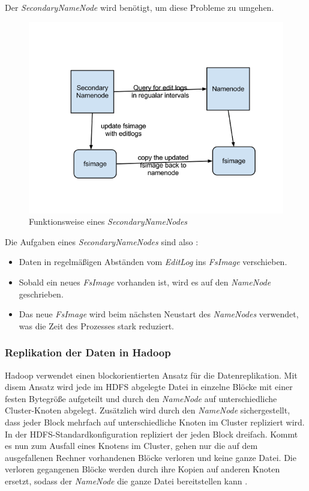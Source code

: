 Der \textit{SecondaryNameNode} wird benötigt, um diese Probleme zu umgehen.\\
\begin{figure}[htbp]
	\centering
	\includegraphics[width=1.0\textwidth]{images/06secondarynamenode.png}
	\caption{Funktionsweise eines \textit{SecondaryNameNodes}}
	\label{img:grafik-SecondaryNameNode}
\end{figure}

Die Aufgaben eines \textit{SecondaryNameNodes} sind also  \cite{secNameNode}:
\begin{itemize}
\item Daten in regelmäßigen Abständen vom \textit{EditLog} ins \textit{FsImage} verschieben.
\item Sobald ein neues \textit{FsImage}  vorhanden ist, wird es auf den \textit{NameNode} geschrieben.
\item Das neue \textit{FsImage}  wird beim nächsten Neustart des \textit{NameNodes} verwendet, was die Zeit des Prozesses stark reduziert. %
\end{itemize}

\subsubsection{Replikation der Daten in Hadoop}
Hadoop verwendet einen blockorientierten Ansatz für die Datenreplikation. Mit disem Ansatz wird jede im \ac{HDFS} abgelegte Datei in einzelne Blöcke mit einer festen Bytegröße aufgeteilt und durch den \textit{NameNode} auf unterschiedliche Cluster-Knoten abgelegt. Zusätzlich wird durch den \textit{NameNode} sichergestellt, dass jeder Block mehrfach auf unterschiedliche Knoten im Cluster repliziert wird.
In der HDFS-Standardkonfiguration repliziert der \cite{replikation} jeden Block dreifach. Kommt es nun zum Ausfall eines Knotens im Cluster, gehen nur die auf dem ausgefallenen Rechner vorhandenen Blöcke verloren und keine ganze Datei. Die verloren gegangenen Blöcke werden durch ihre Kopien auf anderen Knoten ersetzt, sodass der \textit{NameNode} die ganze Datei bereitstellen kann \cite{replikation}.


